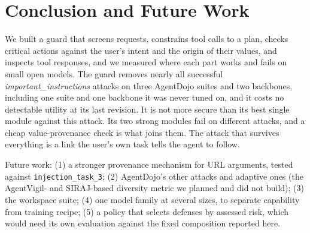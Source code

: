 \documentclass[11pt]{article}
\newcommand{\inj}[1]{\texttt{injection\_task\_#1}}
\begin{document}
\section{Conclusion and Future Work}
\label{sec:conclusion}
We built a guard that screens requests, constrains tool calls to a plan, checks critical actions against the user's intent and the origin of their values, and inspects tool responses, and we measured where each part works and fails on small open models. The guard removes nearly all successful \textit{important\_instructions} attacks on three AgentDojo suites and two backbones, including one suite and one backbone it was never tuned on, and it costs no detectable utility at its last revision. It is not more secure than its best single module against this attack. Its two strong modules fail on different attacks, and a cheap value-provenance check is what joins them. The attack that survives everything is a link the user's own task tells the agent to follow.

Future work: (1) a stronger provenance mechanism for URL arguments, tested against \inj{3}; (2) AgentDojo's other attacks and adaptive ones (the AgentVigil- and SIRAJ-based diversity metric we planned and did not build); (3) the workspace suite; (4) one model family at several sizes, to separate capability from training recipe; (5) a policy that selects defenses by assessed risk, which would need its own evaluation against the fixed composition reported here.

\end{document}

